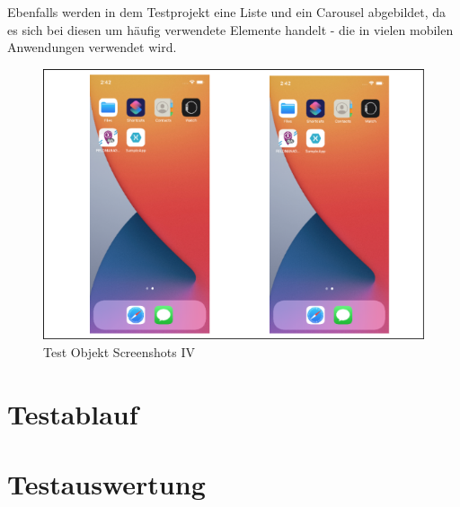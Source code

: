 Ebenfalls werden in dem Testprojekt eine Liste und ein Carousel abgebildet,  da es sich bei diesen um häufig verwendete Elemente handelt - die in vielen mobilen Anwendungen verwendet wird. 

\begin{figure}[!ht]
 \includegraphics[width=\textwidth,keepaspectratio]{Images/Screenshot/AppIconAndMenu.png}
 \caption{Test Objekt Screenshots IV}
 \label{fig:TestObjectIV}
\end{figure}




\section{Testablauf}




\section{Testauswertung}


